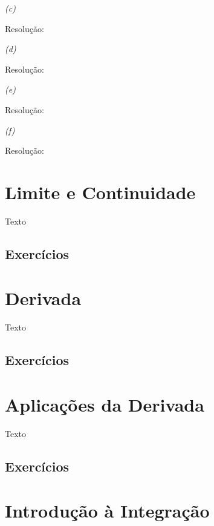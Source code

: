 \documentclass[12 pt, openright, twoside, a4paper, english, french, spanish, brazil]{abntex2}
\begin{document}
\textit{(c)} 

Resolução:
\bigskip


\textit{(d)}

Resolução:
\bigskip


\textit{(e)}

Resolução:
\bigskip


\textit{(f)}

Resolução:
\bigskip


\section{Limite e Continuidade}

Texto

\subsection{Exercícios}

\section{Derivada}

Texto

\subsection{Exercícios}

\section{Aplicações da Derivada}

Texto

\subsection{Exercícios}

\section{Introdução à Integração}
\end{document}
